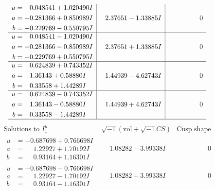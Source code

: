 \documentclass[1p]{elsarticle_modified}
\theoremstyle{definition}
\newcommand{\I}{\sqrt{-1}}
\begin{document}
$$\begin{array}{c|c|c}
\begin{aligned}
u &= \phantom{-}0.048541 + 1.020490 I \\
a &= -0.281366 + 0.850989 I \\
b &= -0.229769 - 0.550795 I\end{aligned}
 & \phantom{-}2.37651 - 1.33885 I & \phantom{-0.000000 } 0 \\ \hline\begin{aligned}
u &= \phantom{-}0.048541 - 1.020490 I \\
a &= -0.281366 - 0.850989 I \\
b &= -0.229769 + 0.550795 I\end{aligned}
 & \phantom{-}2.37651 + 1.33885 I & \phantom{-0.000000 } 0 \\ \hline\begin{aligned}
u &= \phantom{-}0.624839 + 0.743352 I \\
a &= \phantom{-}1.36143 + 0.58880 I \\
b &= \phantom{-}0.33558 + 1.44289 I\end{aligned}
 & \phantom{-}1.44939 - 4.62743 I & \phantom{-0.000000 } 0 \\ \hline\begin{aligned}
u &= \phantom{-}0.624839 - 0.743352 I \\
a &= \phantom{-}1.36143 - 0.58880 I \\
b &= \phantom{-}0.33558 - 1.44289 I\end{aligned}
 & \phantom{-}1.44939 + 4.62743 I & \phantom{-0.000000 } 0\\
 \hline 
 \end{array}$$\newpage$$\begin{array}{c|c|c}  
\text{Solutions to }I^u_{1}& \I (\text{vol} + \sqrt{-1}CS) & \text{Cusp shape}\\
 \hline 
\begin{aligned}
u &= -0.687698 + 0.766698 I \\
a &= \phantom{-}1.22927 + 1.70192 I \\
b &= \phantom{-}0.93164 + 1.16301 I\end{aligned}
 & \phantom{-}1.08282 - 3.99338 I & \phantom{-0.000000 } 0 \\ \hline\begin{aligned}
u &= -0.687698 - 0.766698 I \\
a &= \phantom{-}1.22927 - 1.70192 I \\
b &= \phantom{-}0.93164 - 1.16301 I\end{aligned}
 & \phantom{-}1.08282 + 3.99338 I & \phantom{-0.000000 } 0 \\ \hline\begin{aligned}

\end{aligned}
\end{array}$$
\end{document}

